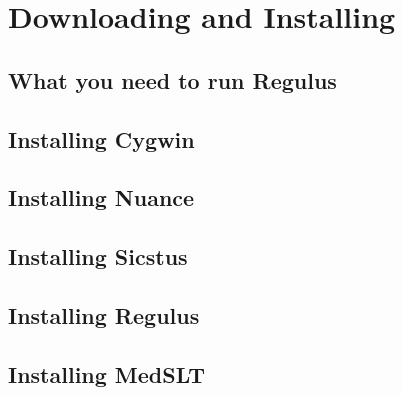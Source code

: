 \chapter{Downloading and Installing}
\label{Chapter:DownloadingAndInstalling}

\author{Manny Rayner}

\section{What you need to run Regulus}
\label{Section:Requirements}

\section{Installing Cygwin}
\label{Section:InstallingCygwin}

\section{Installing Nuance}
\label{Section:InstallingNuance}

\section{Installing Sicstus}
\label{Section:InstallingSicstus}

\section{Installing Regulus}
\label{Section:InstallingRegulus}

\section{Installing MedSLT}
\label{Section:InstallingMedSLT}

